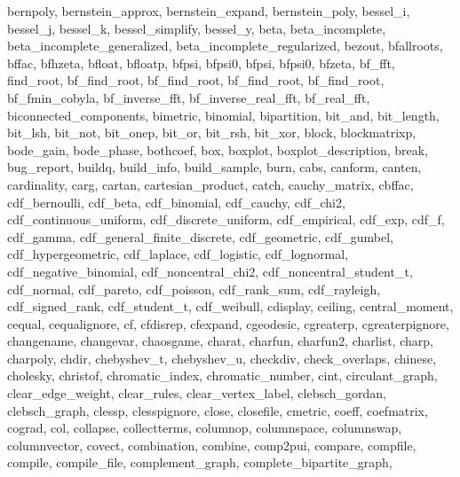 {{    bernpoly,
    bernstein_approx,
    bernstein_expand,
    bernstein_poly,
    bessel_i,
    bessel_j,
    bessel_k,
    bessel_simplify,
    bessel_y,
    beta,
    beta_incomplete,
    beta_incomplete_generalized,
    beta_incomplete_regularized,
    bezout,
    bfallroots,
    bffac,
    bfhzeta,
    bfloat,
    bfloatp,
    bfpsi,
    bfpsi0,
    bfpsi,
    bfpsi0,
    bfzeta,
    bf_fft,
    find_root,
    bf_find_root,
    bf_find_root,
    bf_find_root,
    bf_find_root,
    bf_fmin_cobyla,
    bf_inverse_fft,
    bf_inverse_real_fft,
    bf_real_fft,
    biconnected_components,
    bimetric,
    binomial,
    bipartition,
    bit_and,
    bit_length,
    bit_lsh,
    bit_not,
    bit_onep,
    bit_or,
    bit_rsh,
    bit_xor,
    block,
    blockmatrixp,
    bode_gain,
    bode_phase,
    bothcoef,
    box,
    boxplot,
    boxplot_description,
    break,
    bug_report,
    buildq,
    build_info,
    build_sample,
    burn,
    cabs,
    canform,
    canten,
    cardinality,
    carg,
    cartan,
    cartesian_product,
    catch,
    cauchy_matrix,
    cbffac,
    cdf_bernoulli,
    cdf_beta,
    cdf_binomial,
    cdf_cauchy,
    cdf_chi2,
    cdf_continuous_uniform,
    cdf_discrete_uniform,
    cdf_empirical,
    cdf_exp,
    cdf_f,
    cdf_gamma,
    cdf_general_finite_discrete,
    cdf_geometric,
    cdf_gumbel,
    cdf_hypergeometric,
    cdf_laplace,
    cdf_logistic,
    cdf_lognormal,
    cdf_negative_binomial,
    cdf_noncentral_chi2,
    cdf_noncentral_student_t,
    cdf_normal,
    cdf_pareto,
    cdf_poisson,
    cdf_rank_sum,
    cdf_rayleigh,
    cdf_signed_rank,
    cdf_student_t,
    cdf_weibull,
    cdisplay,
    ceiling,
    central_moment,
    cequal,
    cequalignore,
    cf,
    cfdisrep,
    cfexpand,
    cgeodesic,
    cgreaterp,
    cgreaterpignore,
    changename,
    changevar,
    chaosgame,
    charat,
    charfun,
    charfun2,
    charlist,
    charp,
    charpoly,
    chdir,
    chebyshev_t,
    chebyshev_u,
    checkdiv,
    check_overlaps,
    chinese,
    cholesky,
    christof,
    chromatic_index,
    chromatic_number,
    cint,
    circulant_graph,
    clear_edge_weight,
    clear_rules,
    clear_vertex_label,
    clebsch_gordan,
    clebsch_graph,
    clessp,
    clesspignore,
    close,
    closefile,
    cmetric,
    coeff,
    coefmatrix,
    cograd,
    col,
    collapse,
    collectterms,
    columnop,
    columnspace,
    columnswap,
    columnvector,
    covect,
    combination,
    combine,
    comp2pui,
    compare,
    compfile,
    compile,
    compile_file,
    complement_graph,
    complete_bipartite_graph,
}}
